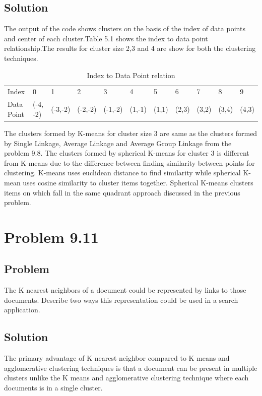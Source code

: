 \documentclass[12pt]{report}
\begin{document}
\section{Solution}


The output of the code shows clusters on the basis of the index of data points and center of each cluster.Table 5.1 shows the index to data point relationship.The results for cluster size 2,3 and 4 are show for both the clustering techniques.\\
\begin{table}[]
\centering
\caption{Index  to Data Point relation}
\label{my-label}
\begin{tabular}{lllllllllll}
Index      & 0        & 1       & 2       & 3       & 4      & 5     & 6     & 7     & 8     & 9     \\
Data Point & (-4, -2) & (-3,-2) & (-2,-2) & (-1,-2) & (1,-1) & (1,1) & (2,3) & (3,2) & (3,4) & (4,3)
\end{tabular}
\end{table}
The clusters formed by K-means for cluster size 3 are same as the clusters formed by Single Linkage, Average Linkage and Average Group Linkage from the problem 9.8. The clusters formed by spherical K-means for cluster 3 is different from K-means due to the difference between finding similarity between points for clustering. K-means uses euclidean distance to find similarity while spherical K-mean uses cosine similarity to cluster items together. Spherical K-means clusters items on which fall in the same quadrant approach discussed in the previous problem.\\
\chapter{Problem 9.11}
\section{Problem}
The K nearest neighbors of a document could be represented by links to those documents. Describe two ways this representation could be used in a search application.
\section{Solution}
The primary advantage of K nearest neighbor compared to K means and agglomerative clustering techniques is that a document can be present in multiple clusters unlike the K means and agglomerative clustering technique where each documents is in a single cluster.\\
\end{document}
